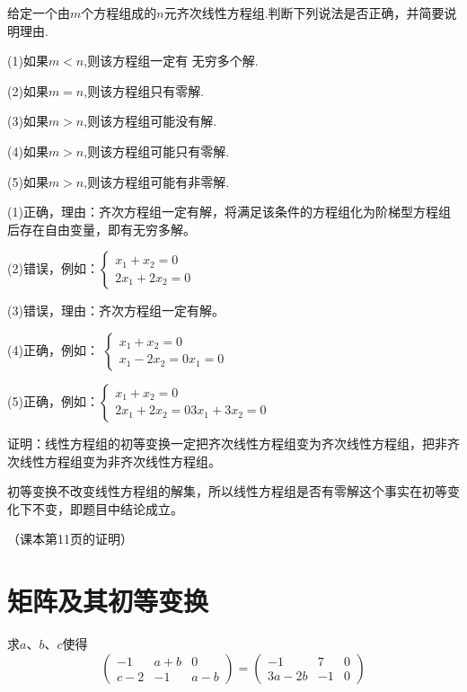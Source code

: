 \documentclass[a4paper]{report}
\begin{document}
\EX 给定一个由$m$个方程组成的$n$元齐次线性方程组.判断下列说法是否正确，并简要说明理由.

(1)如果$m< n$,则该方程组一定有 无穷多个解.

(2)如果$m=n$,则该方程组只有零解.

(3)如果$m>n$,则该方程组可能没有解.

(4)如果$m> n$,则该方程组可能只有零解.

(5)如果$m> n$,则该方程组可能有非零解.

\begin{jie}
(1)正确，理由：齐次方程组一定有解，将满足该条件的方程组化为阶梯型方程组后存在自由变量，即有无穷多解。

(2)错误，例如：$
\begin{cases}
x_1+x_2=0\\
2x_1+2x_2=0
\end{cases}
$

(3)错误，理由：齐次方程组一定有解。

(4)正确，例如：
$
\begin{cases}
x_1+x_2=0\\
x_1-2x_2=0
x_1=0
\end{cases}
$

(5)正确，例如：$
\begin{cases}
x_1+x_2=0\\
2x_1+2x_2=0
3x_1+3x_2=0
\end{cases}
$
\end{jie}

\EX 证明：线性方程组的初等变换一定把齐次线性方程组变为齐次线性方程组，把非齐次线性方程组变为非齐次线性方程组。
\begin{zhengming}
初等变换不改变线性方程组的解集，所以线性方程组是否有零解这个事实在初等变化下不变，即题目中结论成立。

（课本第11页的证明）
\end{zhengming}

\clearpage
\section{矩阵及其初等变换}
\EX 求$a$、$b$、$c$使得
\begin{equation*}
\begin{pmatrix}
-1&a+b&0\\ c-2&-1&a-b
\end{pmatrix}=\begin{pmatrix}
-1&7&0\\ 3a-2b&-1&0
\end{pmatrix}
\end{equation*}
\end{document}
